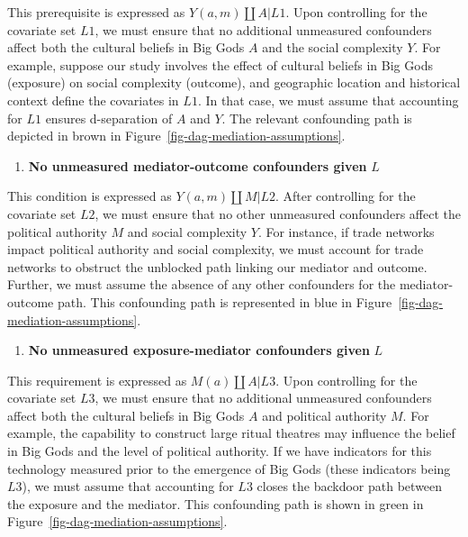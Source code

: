 \documentclass[
  singlecolumn]{article}
\providecommand{\tightlist}{%
  \setlength{\itemsep}{0pt}\setlength{\parskip}{0pt}}\usepackage{longtable,booktabs,array}
\begin{document}
This prerequisite is expressed as \(Y(a,m) \coprod A | L1\). Upon
controlling for the covariate set \(L1\), we must ensure that no
additional unmeasured confounders affect both the cultural beliefs in
Big Gods \(A\) and the social complexity \(Y\). For example, suppose our
study involves the effect of cultural beliefs in Big Gods (exposure) on
social complexity (outcome), and geographic location and historical
context define the covariates in \(L1\). In that case, we must assume
that accounting for \(L1\) ensures d-separation of \(A\) and \(Y\). The
relevant confounding path is depicted in brown in
Figure~\ref{fig-dag-mediation-assumptions}.

\begin{enumerate}
\def\labelenumi{\arabic{enumi}.}
\setcounter{enumi}{1}
\tightlist
\item
  \textbf{No unmeasured mediator-outcome confounders given} \(L\)
\end{enumerate}

This condition is expressed as \(Y(a,m) \coprod M | L2\). After
controlling for the covariate set \(L2\), we must ensure that no other
unmeasured confounders affect the political authority \(M\) and social
complexity \(Y\). For instance, if trade networks impact political
authority and social complexity, we must account for trade networks to
obstruct the unblocked path linking our mediator and outcome. Further,
we must assume the absence of any other confounders for the
mediator-outcome path. This confounding path is represented in blue in
Figure~\ref{fig-dag-mediation-assumptions}.

\begin{enumerate}
\def\labelenumi{\arabic{enumi}.}
\setcounter{enumi}{2}
\tightlist
\item
  \textbf{No unmeasured exposure-mediator confounders given} \(L\)
\end{enumerate}

This requirement is expressed as \(M(a) \coprod A | L3\). Upon
controlling for the covariate set \(L3\), we must ensure that no
additional unmeasured confounders affect both the cultural beliefs in
Big Gods \(A\) and political authority \(M\). For example, the
capability to construct large ritual theatres may influence the belief
in Big Gods and the level of political authority. If we have indicators
for this technology measured prior to the emergence of Big Gods (these
indicators being \(L3\)), we must assume that accounting for \(L3\)
closes the backdoor path between the exposure and the mediator. This
confounding path is shown in green in
Figure~\ref{fig-dag-mediation-assumptions}.
\end{document}
